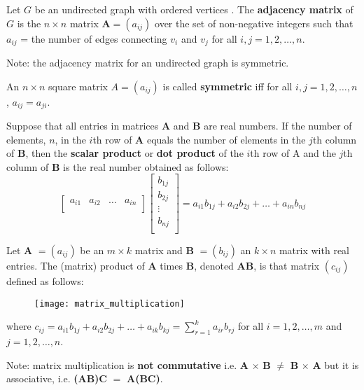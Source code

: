\documentclass{article}
\begin{document}
\begin{description}
    \item[Adjacency Matrix of an Undirected Graph] Let $G$ be an undirected graph with ordered vertices . The \textbf{adjacency matrix} of $G$ is the $n\times n$ matrix $\mathbf{A}=(a_{ij})$ over the set of non-negative integers such that $a_{ij}$ = the number of edges connecting $v_{i}$ and $v_{j}$ for all $i, j = 1, 2, \dots, n$.
    \item \qquad Note: the adjacency matrix for an undirected graph is symmetric.
    \item[Symmetric Matrix] An $n\times n$ square matrix $A=(a_{ij})$ is called \textbf{symmetric} iff for all $i,j=1,2,\dots, n$, $a_{ij}=a_{ji}$.
    \item[Scalar Product] Suppose that all entries in matrices \textbf{A} and \textbf{B} are real numbers. If the number of elements, $n$, in the $i$th row of \textbf{A} equals the number of elements in the $j$th column of \textbf{B}, then the \textbf{scalar product} or \textbf{dot product} of the $i$th row of A and the $j$th column of \textbf{B} is the real number obtained as follows: 
    \[ 
	\begin{bmatrix}
	   	a_{i1} & a_{i2} & \dots & a_{in} \\
	\end{bmatrix}
	\begin{bmatrix}
    	b_{1j} \\
    	b_{2j} \\
		\vdots \\
		b_{nj} \\
    \end{bmatrix}
    = a_{i1}b_{1j} + a_{i2}b_{2j} + \dots + a_{in}b_{nj}
    \]
    \item[Matrix Multiplication] Let \textbf{A} $= (a_{ij})$ be an $m\times k$ matrix and \textbf{B} $= (b_{ij})$ an $k\times n$ matrix with real entries. The (matrix) product of \textbf{A} times \textbf{B}, denoted \textbf{AB}, is that matrix $(c_{ij})$ defined as
follows:
	\begin{figure}[H]
		\centering
		\texttt{[image: matrix\_multiplication]}
	\end{figure}
	\item \qquad where $c_{ij}=a_{i1}b_{1j}+a_{i2}b_{2j}+\dots+a_{ik}b_{kj}=\sum^{k}_{r=1}a_{ir}b_{rj}$ for all $i=1,2,\dots,m$ and $j=1,2,\dots,n$.
	\item \qquad Note: matrix multiplication is \textbf{not commutative} i.e. \textbf{A} $\times$ \textbf{B} $\neq$ \textbf{B} $\times$ \textbf{A} but it is associative, i.e. \textbf{(AB)C} $=$ \textbf{A(BC)}.

\end{description}
\end{document}
